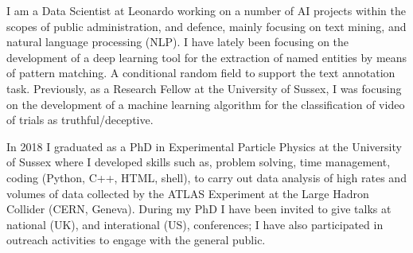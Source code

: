
I am a Data Scientist at Leonardo working on a number of AI projects within the scopes of public administration, and defence, mainly focusing on text mining, and natural language processing (NLP). I have lately been focusing on the development of a deep learning tool for the extraction of named entities by means of pattern matching. A conditional random field to support the text annotation task. Previously, as a Research Fellow at the University of Sussex, I was focusing on the development of a machine learning algorithm for the classification of video of trials as truthful/deceptive. 

In 2018 I graduated as a PhD in Experimental Particle Physics at the University of Sussex where I developed skills such as, problem solving, time management, coding (Python, C++, HTML, shell), to carry out data analysis of high rates and volumes of data collected by the ATLAS Experiment at the Large Hadron Collider (CERN, Geneva). During my PhD I have been invited to give talks at national (UK), and interational (US), conferences; I have also participated in outreach activities to engage with the general public.